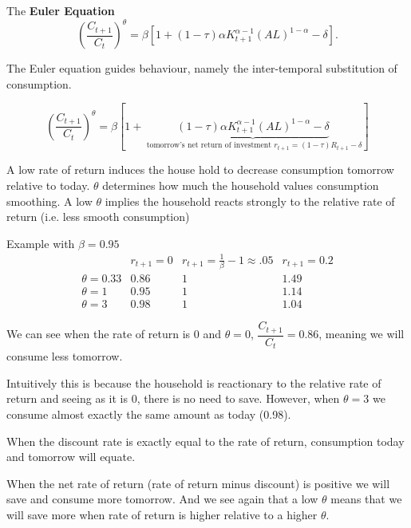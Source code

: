 \documentclass[11pt]{article}
\begin{document}
\begin{shaded}
The \textbf{Euler Equation}
    \begin{equation}
    \label{euler}
\left(\frac{C_{t+1}}{C_t}\right)^\theta=\beta\left[1+(1-\tau) \alpha K_{t+1}^{\alpha-1}(A L)^{1-\alpha}-\delta\right] .
\end{equation}

The Euler equation guides behaviour, namely the inter-temporal substitution of consumption. 
\begin{intu}
\[\left(\frac{C_{t+1}}{C_t}\right)^\theta=\beta\left[1+\underbrace{(1-\tau) \alpha K_{t+1}^{\alpha-1}(A L)^{1-\alpha}-\delta}_{\text { tomorrow's net return of investment } r_{t+1} = (1-\tau)R_{t+1} - \delta}\right] \]

A low rate of return induces the house hold to decrease consumption tomorrow relative to today. $\theta$ determines how much the household values consumption smoothing. A low $\theta$ implies the household reacts strongly to the relative rate of return (i.e. less smooth consumption)




\end{intu}

\end{shaded}

Example with $\beta = 0.95$
\begin{equation}
\begin{array}{c|c|c|c} 
& r_{t+1}=0 & r_{t+1}=\frac{1}{\beta}-1 \approx .05 & r_{t+1}=0.2 \\
\hline \theta=0.33 & 0.86 & 1 & 1.49 \\
\theta=1 & 0.95 & 1 & 1.14 \\
\theta=3 & 0.98 & 1 & 1.04
\end{array}
\end{equation}

We can see when the rate of return is 0 and $\theta = 0$, $\dfrac{C_{t+1}}{C_t}=0.86$, meaning we will consume less  tomorrow. 

\begin{intu}
    Intuitively this is because the household is reactionary to the relative rate of return and seeing as it is 0, there is no need to save. However, when $\theta=3$ we consume almost exactly the same amount as today (0.98).

When the discount rate is exactly equal to the rate of return, consumption today and tomorrow will equate.

When the net rate of return (rate of return minus discount) is positive we will save and consume more tomorrow. And we see again that a low $\theta$ means that we will save more when rate of return is higher relative to a higher $\theta$.
\end{intu}
\end{document}
